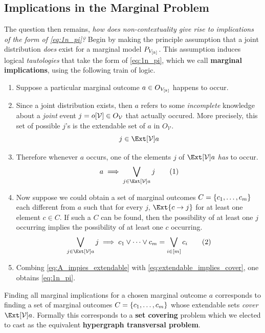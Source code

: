 \documentclass[aps, 10pt, english, twoside, pra, nofootinbib, longbibliography]{revtex4-1}
\theoremstyle{plain}
\theoremstyle{definition}
\theoremstyle{remark}
\newcommand{\term}[1]{\textcolor{Mahogany}{\textbf{#1}}}
\newcommand{\outc}[1]{o\!\bs{#1}} %
\begin{document}
    \subsection{Implications in the Marginal Problem}
    \label{sec:implications_marginal_problem}
    The question then remains, \textit{how does non-contextuality give rise to implications of the form of \cref{eq:1n_pi}?} Begin by making the principle assumption that a joint distribution \textit{does} exist for a marginal model $\prob[V_{\bs{k}}]$. This assumption induces logical \textit{tautologies} that take the form of \cref{eq:1n_pi}, which we call \term{marginal implications}, using the following train of logic.
    \begin{enumerate}
        \item Suppose a particular marginal outcome $a \in O_{V_{\left[ k \right]}}$ happens to occur.
        \item Since a joint distribution exists, then $a$ refers to some \textit{incomplete} knowledge about a \textit{joint} event $j = \outc{\mathcal{V}} \in O_{\mathcal{V}}$ that actually occured. More precisely, this set of possible $j$'s is the extendable set of $a$ in $O_{\mathcal{V}}$.
        \[ j \in \Ext[\mathcal{V}]{a} \]
        \item Therefore whenever $a$ occurs, one of the elements $j$ of $\Ext[\mathcal{V}]{a}$ \textit{has} to occur.
        \[ a \implies \bigvee_{j \in \Ext[\mathcal{V}]{a}} j \eq \label{eq:A_impies_extendable}\]
        \item Now suppose we could obtain a set of marginal outcomes $C = \left\{ c_1, \ldots, c_m \right\}$ each different from $a$ such that for every $j$, $\Ext{c \to j}$ for at least one element $c \in C$. If such a $C$ can be found, then the possibility of at least one $j$ occurring implies the possibility of at least one $c$ occurring.
        \[ \bigvee_{j \in \Ext[\mathcal{V}]{a}} j \implies c_1 \vee \cdots \vee c_m = \bigvee_{i \in \bs{m}} c_i\eq \label{eq:extendable_implies_cover} \]

        \item Combing \cref{eq:A_impies_extendable} with \cref{eq:extendable_implies_cover}, one obtains \cref{eq:1n_pi}.
    \end{enumerate}


    Finding all marginal implications for a chosen marginal outcome $a$ corresponds to finding a set of marginal outcomes $C = \left\{ c_1, \ldots, c_m \right\}$ whose extendable sets \textit{cover} $\Ext[\mathcal{V}]{a}$. Formally this corresponds to a \term{set covering} problem  which we elected to cast as the equivalent \term{hypergraph transversal problem}.
\end{document}
